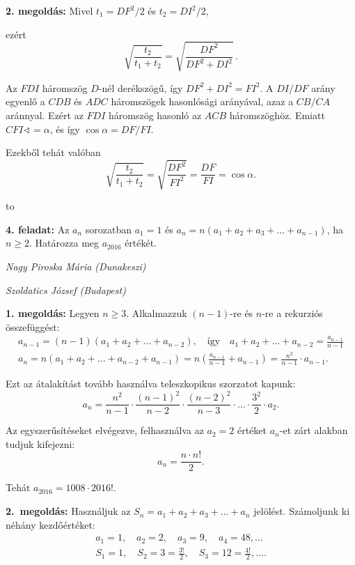 \documentclass[a4paper,10pt]{article}
\newcommand{\ki}[2]{\hfill {\it #1 (#2)}\medskip}
\newcommand{\vonal}{\hbox to \hsize{\hskip2truecm\hrulefill\hskip2truecm}}
\begin{document}
\medskip

{\bf 2. megoldás:} Mivel $t_1=DF^2/2$ és $t_2=DI^2/2$, 

\noindent ezért
\[\sqrt{\frac{t_2}{t_1+t_2}}=\sqrt{\frac{DF^2}{DF^2+DI^2}}\,.\]

\noindent Az $FDI$ háromszög $D$-nél derékszögű, így $DF^2+DI^2=FI^2$. A $DI/DF$ arány egyenlő a $CDB$ és $ADC$ háromszögek hasonlósági arányával, azaz a $CB/CA$ aránnyal. Ezért az $FDI$ háromszög hasonló az $ACB$ háromszöghöz. Emiatt $CFI\sphericalangle =\alpha$, és így $\cos\alpha =DF/FI$.  

\smallskip

\noindent Ezekből tehát valóban
\[\sqrt{\frac{t_2}{t_1+t_2}}=\sqrt{\frac{DF^2}{FI^2}}=\frac{DF}{FI}=\cos\alpha .\]

\vonal

{\bf 4. feladat: } Az $a_n$ sorozatban $a_1=1$ és $a_n=n\left(a_1+a_2+a_3+\ldots+a_{n-1}\right)$, ha $n \geq 2$. Határozza meg $a_{2016}$ értékét.

\ki{Nagy Piroska Mária}{Dunakeszi}

\ki{Szoldatics József}{Budapest}\medskip

{\bf 1. megoldás:} Legyen $n\geq 3$. Alkalmazzuk $(n-1)$-re és $n$-re a rekurziós összefüggést:
\begin{gather}
a_{n-1}=(n-1)(a_1+a_2+\ldots+a_{n-2}), \quad\text{így}\quad  a_1+a_2+\ldots+a_{n-2}=\frac {a_{n-1}} {n-1}\\
a_n=n(a_1+a_2+\ldots+a_{n-2}+a_{n-1})=n \left(\frac {a_{n-1}} {n-1}+a_{n-1} \right)=\frac {n^2} {n-1} \cdot  a_{n-1}.
\end{gather}

\noindent Ezt az átalakítást tovább használva teleszkopikus szorzatot kapunk:
\[ a_n=\frac {n^2} {n-1} \cdot \frac {(n-1)^2} {n-2} \cdot \frac {(n-2)^2} {n-3}\cdot \ldots \cdot\frac {3^2} 2 \cdot a_2. \]

\noindent Az egyszerűsítéseket elvégezve, felhasználva az $a_2=2$ értéket $a_n$-et zárt alakban tudjuk kifejezni:
\[ a_n=\frac {n\cdot n!} 2. \]

\noindent Tehát $a_{2016}=1008 \cdot 2016!$.

\medskip

{\bf 2.~megoldás:} Használjuk az  $S_n=a_1+a_2+a_3+\ldots+a_n$ jelölést. Számoljunk ki néhány kezdőértéket:
\begin{gather*}
a_1=1, \quad a_2=2, \quad a_3=9, \quad a_4=48,\ldots \\
 S_1=1, \quad S_2=3=\frac {3!} 2, \quad S_3=12=\frac {4!} 2, \ldots. 
\end{gather*}
\end{document}
